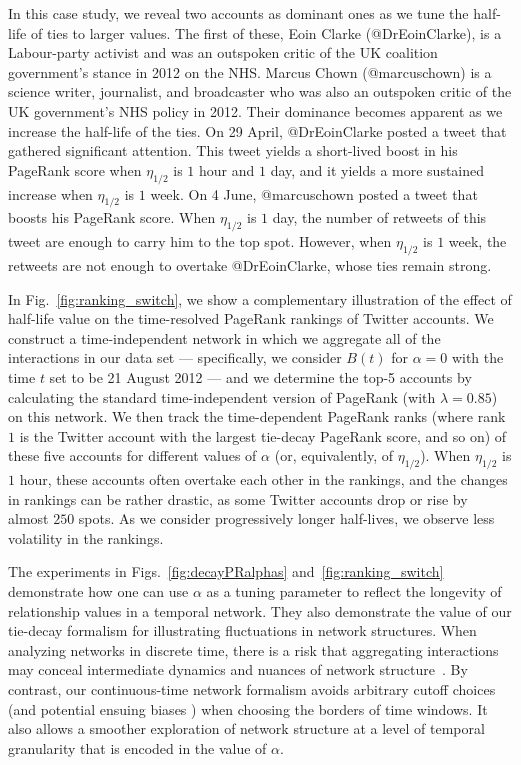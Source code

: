 \documentclass[journal,transmag]{IEEEtran}
\begin{document}
In this case study, we reveal two accounts as dominant ones as we tune
the half-life of ties to larger values. The first of these, Eoin
Clarke ({\sc @DrEoinClarke}), is a Labour-party activist and was an
outspoken critic of the UK coalition government's stance in 2012 on
the NHS. Marcus Chown ({\sc @marcuschown}) is a science writer,
journalist, and broadcaster who was also an outspoken critic of the UK
government's NHS policy in 2012. Their dominance becomes apparent
as we increase the half-life of the ties. On 29 April, {\sc
  @DrEoinClarke} posted a tweet that gathered significant
attention. This tweet yields a short-lived boost in his PageRank score
when $\eta_{1/2}$ is $1$ hour and $1$ day, and it yields a more
sustained increase when $\eta_{1/2}$ is $1$ week. On 4 June, {\sc
  @marcuschown} posted a tweet that boosts
  his PageRank score. When $\eta_{1/2}$ is $1$ day, the number of retweets of this
tweet are enough to carry him to the top spot. However, when
$\eta_{1/2}$ is $1$ week, the retweets are not enough to overtake {\sc
  @DrEoinClarke}, whose ties remain strong.

In Fig.~\ref{fig:ranking_switch}, we show a complementary illustration
of the effect of half-life value on the time-resolved PageRank rankings of
Twitter accounts. We construct a time-independent network in which we
aggregate all of the interactions in our data set --- specifically, we
consider $B(t)$ for $\alpha=0$ with the time $t$ set to be 21 August
2012 --- and we determine the top-5 accounts by calculating the
standard time-independent version of PageRank (with $\lambda=0.85$) on
this network. We then track the 
time-dependent 
PageRank ranks (where rank $1$
is the Twitter account with the largest tie-decay PageRank score, and so on) of
these five accounts for different values of $\alpha$ (or,
equivalently, of $\eta_{1/2}$). When $\eta_{1/2}$ is $1$ hour, these
accounts often overtake each other in the rankings, and the changes in
rankings can be rather drastic, as some Twitter accounts drop or rise
by almost $250$ spots. As we consider progressively longer
half-lives, we observe less volatility in the rankings.

The experiments in Figs.~\ref{fig:decayPRalphas}
and~\ref{fig:ranking_switch} demonstrate how one can use $\alpha$ as a
tuning parameter to reflect the longevity of relationship values in a
temporal network. They also demonstrate the value of our tie-decay
formalism for illustrating fluctuations in network structures. When
analyzing networks in discrete time, there is a risk that aggregating
interactions may conceal intermediate dynamics and nuances of network
structure~\cite{fenn2012}. By contrast, our continuous-time network
formalism avoids arbitrary cutoff choices (and potential ensuing
biases \cite{kivela2015}) when choosing the borders of time windows.
It also allows a smoother exploration of network structure at a level of
temporal granularity that is encoded in the value of $\alpha$.
\end{document}
